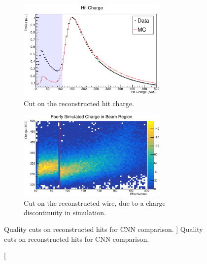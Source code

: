 \begin{figure}

	\begin{subfigure}[b]{\textwidth}
		\centering
		\includegraphics[width=0.8\textwidth]{figures/charge_nocuts.pdf}
		\caption {Cut on the reconstructed hit charge.}
		\label{fig:charge_cuts}
	\end{subfigure}

	\begin{subfigure}[b]{\textwidth}
		\centering
		\includegraphics[width=0.8\textwidth]{figures/charge_discontinuity.pdf}
		\caption {Cut on the reconstructed wire, due to a charge discontinuity in
		simulation.}
		\label{fig:90_wires_charge}
	\end{subfigure}

	\caption 
	[ Quality cuts on reconstructed hits for CNN comparison. ]
	{ Quality cuts on reconstructed hits for CNN comparison. }
	\label{fig:cnn_cuts_charge}

\end{figure}

